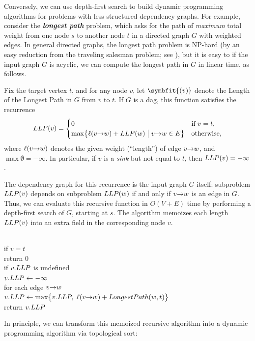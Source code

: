 Conversely, we can use depth-first search to build dynamic programming algorithms for problems with less structured dependency graphs.
For example, consider the \textbf{\textit{longest path}} problem, which asks for the path of \textit{maximum} total weight from one node $s$ to another node $t$ in a directed graph $G$ with weighted edges.
In general directed graphs, the longest path problem is NP-hard (by an easy reduction from the traveling salesman problem; see ), but it is easy to if the input graph $G$ is acyclic, we can compute the longest path in $G$ in linear time, as follows.

Fix the target vertex $t$, and for any node $v$, let \textbf{}$\symbfit{(v)}$ denote the Length of the Longest Path in $G$ from $v$ to $t$.
If $G$ is a dag, this function satisfies the recurrence
\[
LLP(v) = \begin{cases}
0 & \text{if $v = t$,}\\
\max\bigl\{\ell(v\mathord{\rightarrow}w) + LLP(w) \bigm| v\mathord{\rightarrow}w \in E\bigr\} & \text{otherwise,}
\end{cases}
\]
where $\ell(v\mathord{\rightarrow}w)$ denotes the given weight (“length”) of edge $v\mathord{\rightarrow}w$, and $\max \emptyset = -\infty$.
In particular, if $v$ is a \textit{sink} but not equal to $t$, then $LLP(v) = -\infty$.

The dependency graph for this recurrence is the input graph $G$ itself: subproblem $LLP(v)$ depends on subproblem $LLP(w)$ if and only if $v\mathord{\rightarrow}w$ is an edge in $G$.
Thus, we can evaluate this recursive function in $O(V+E)$ time by performing a depth-first search of $G$, starting at $s$.
The algorithm memoizes each length $LLP(v)$ into an extra field in the corresponding node $v$.

\begin{pseudocode}
\\
if $v = t$\\
\Indent return $0$\\
if $v.LLP$ is undefined\\
\Indent $v.LLP \gets -\infty$\\
\Indent for each edge $v\mathord{\rightarrow}w$\\
\Indent\Indent $v.\Var{LLP} \gets \max\bigl\{v.\Var{LLP},\ \ell(\arc{v}{w}) + \Proc{LongestPath}(w, t)\bigr\}$\\
\Indent return $v.LLP$
\end{pseudocode}

In principle, we can transform this memoized recursive algorithm into a dynamic programming algorithm via topological sort:

